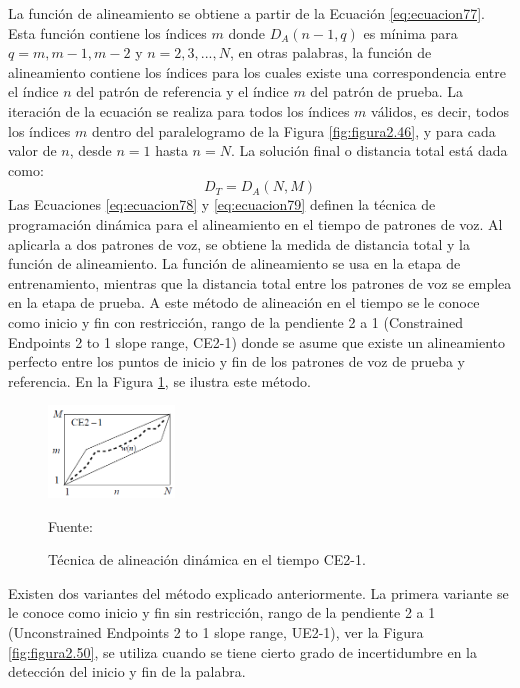 \begin{enumerate}
La función de alineamiento se obtiene a partir de la Ecuación \eqref{eq:ecuacion77}. Esta función contiene los índices $m$ donde $D_{A}(n - 1, q)$ es mínima para $q = m, m-1, m-2$ y $n = 2,3,...,N$, en otras palabras, la función de alineamiento contiene los índices para los cuales existe una correspondencia entre el índice $n$ del patrón de referencia y el índice $m$ del patrón de prueba.
\vskip 0.5cm
La iteración de la ecuación se realiza para todos los índices $m$ válidos, es decir, todos los índices $m$ dentro del paralelogramo de la Figura \ref{fig:figura2.46}, y para cada valor de $n$, desde $n = 1$ hasta $n = N$. La solución final o distancia total está dada como:
\begin{equation}
\label{eq:ecuacion79}
D_{T} = D_{A}(N,M)
\end{equation}
Las Ecuaciones \eqref{eq:ecuacion78} y \eqref{eq:ecuacion79} definen la técnica de programación dinámica para el alineamiento en el tiempo de patrones de voz. Al aplicarla a dos patrones de voz, se obtiene la medida de distancia total y la función de alineamiento. La función de alineamiento se usa en la etapa de entrenamiento, mientras que la distancia total entre los patrones de voz se emplea en la etapa de prueba.
\vskip 0.5cm
A este método de alineación en el tiempo se le conoce como inicio y fin con restricción, rango de la pendiente 2 a 1 (Constrained Endpoints 2 to 1 slope range, CE2-1) donde se asume que existe un alineamiento perfecto entre los puntos de inicio y fin de los patrones de voz de prueba y referencia. En la Figura \ref{fig:figura2.49}, se ilustra este método.
\begin{figure}[H]
\begin{center}
\includegraphics[width=0.3\textwidth]{Imagenes/Cap2/image050}
\end{center}
\begin{center}
\vskip -0.5cm
\caption{\small{Técnica de alineación dinámica en el tiempo CE2-1.}}
\label{fig:figura2.49}
{\small{Fuente: \cite{rabiner}}}
\end{center}
\end{figure}
Existen dos variantes del método explicado anteriormente. La primera variante se le conoce como inicio y fin sin restricción, rango de la pendiente 2 a 1 (Unconstrained Endpoints 2 to 1 slope range, UE2-1), ver la Figura \ref{fig:figura2.50}, se utiliza cuando se tiene cierto grado de incertidumbre en la detección del inicio y fin de la palabra. 

\end{enumerate}
